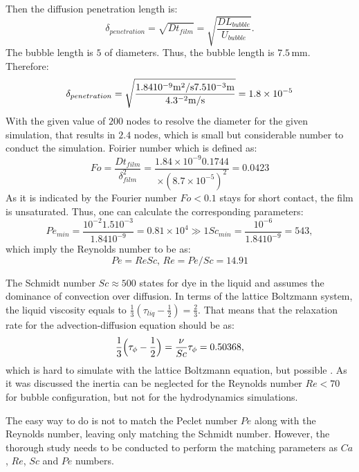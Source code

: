\documentclass{article}
\begin{document}
Then the diffusion penetration length is:
\begin{equation}
\delta_{penetration}=\sqrt{D t_{film}}=\sqrt{\frac{D L_{bubble}}{U_{bubble}}}.
\end{equation}
The bubble length is $5$ of diameters. Thus, the bubble length is $7.5\,\mathrm{mm}$. Therefore:
\begin{equation}
\delta_{penetration}=\sqrt{\frac{1.84 10^{-9} \mathrm{m^2/s} 7.5 10^{-3} \mathrm{m}}{4.3 \time
10^{-2}\mathrm{m/s}}}=1.8 \times 10^{-5}
\end{equation}
With the given value of $200$ nodes to resolve the diameter for the given simulation, that results
in $2.4$ nodes, which is small but considerable number to conduct the simulation.
Foirier number which is defined as:
\begin{equation}
Fo=\frac{D t_{film}}{\delta_{film}^2}=\frac{1.84\times 10^{-9} 0.1744}{\times
(8.7\times10^{-5})^2}=0.0423
\end{equation}
As it is indicated by \citet{vanbaten-circular} the Fourier number $Fo<0.1$ stays for short
contact, the film is unsaturated. 
Thus, one can calculate the corresponding parameters:
\begin{equation}
Pe_{min}=\frac{10^{-2} 1.5 10^{-3}}{1.84  10^{-9}}=0.81 \times 10^{4}\gg 1
Sc_{min}=\frac{10^{-6}}{1.84 10^{-9}}=543,
\end{equation}
which imply the Reynolds number to be as:
\begin{equation}
Pe=Re Sc,\,Re=Pe/Sc=14.91
\end{equation}

The Schmidt number $Sc \approx 500$ states for dye in the liquid and assumes the dominance of
convection over diffusion. In terms of the lattice Boltzmann system, the liquid viscosity equals to
$\frac{1}{3}(\tau_{liq}-\frac{1}{2})=\frac{2}{3}$. That means that the relaxation rate for the
advection-diffusion equation should be as:
\begin{equation}
\frac{1}{3}\Bigl(\tau_{\phi}-\frac{1}{2}\Bigr)=\frac{\nu}{Sc}\\
\tau_{\phi}=0.50368,
\end{equation}
which is hard to simulate with the lattice Boltzmann equation, but possible . As it was discussed
\cite{giavedoni-numerical} the inertia can be neglected for the Reynolds number $Re<70$ for bubble
configuration, but not for the hydrodynamics simulations.

The easy way to do is not to match the Peclet number $Pe$ along with the Reynolds number, leaving
only matching the Schmidt number. However, the thorough study needs to be conducted to perform the
matching parameters as $Ca$, $Re$, $Sc$ and $Pe$ numbers. 
\end{document}

